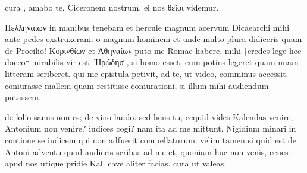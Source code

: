 


 cura , amabo te, Ciceronem nostrum. ei nos θεῖοι videmur.

 Πελληναίων in manibus tenebam et hercule magnum acervum Dicaearchi mihi ante pedes exstruxeram. o magnum hominem et unde multo plura didiceris quam de Procilio! Κορινθίων et Ἀθηναίων puto me Romae habere. mihi †credes lege hec doceo† mirabilis vir est. Ἡρώδησ , si homo esset, eum potius legeret quam unam litteram scriberet. qui me epistula petivit, ad te, ut video, comminus accessit. coniurasse mallem quam restitisse coniurationi, si illum mihi audiendum putassem.

 de lolio sanus non es; de vino laudo. sed heus tu, ecquid vides Kalendas venire, Antonium non venire? iudices cogi? nam ita ad me mittunt, Nigidium minari in contione se iudicem qui non adfuerit compellaturum. velim tamen si quid est de Antoni adventu quod audieris scribas ad me et, quoniam huc non venis, cenes apud nos utique pridie Kal. cave aliter facias. cura ut valeas.
